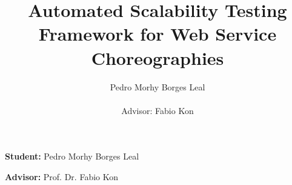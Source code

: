 \documentclass[11pt,a4paper]{article} %
\title{Automated Scalability Testing Framework for Web Service Choreographies}
\author{Pedro Morhy Borges Leal\\\\Advisor: Fabio Kon}
\begin{document}
\maketitle

\newpage

\tableofcontents
\newpage
\textbf{Student:} Pedro Morhy Borges Leal

\textbf{Advisor:} Prof. Dr. Fabio Kon



\newpage

\newpage

\newpage

\newpage

\newpage


 
\end{document}
